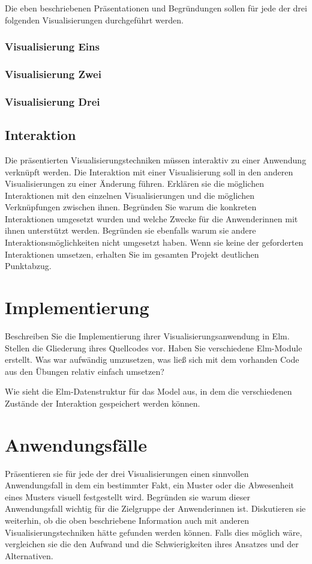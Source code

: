 \documentclass[usegeometry=true]{scrartcl}
\begin{document}
Die eben beschriebenen Präsentationen und Begründungen sollen für jede der drei folgenden Visualisierungen durchgeführt werden. 
\subsubsection{Visualisierung Eins}
\subsubsection{Visualisierung Zwei}
\subsubsection{Visualisierung Drei}

\subsection{Interaktion}
Die präsentierten Visualisierungstechniken müssen interaktiv zu einer Anwendung verknüpft werden.
Die Interaktion mit einer Visualisierung soll in den anderen Visualisierungen zu einer Änderung führen. 
Erklären sie die möglichen Interaktionen mit den einzelnen Visualisierungen und die möglichen Verknüpfungen zwischen ihnen. Begründen Sie warum die konkreten Interaktionen umgesetzt wurden und welche Zwecke für die Anwenderinnen mit ihnen unterstützt werden. Begründen sie ebenfalls warum sie andere Interaktionsmöglichkeiten nicht umgesetzt haben. Wenn sie keine der geforderten Interaktionen umsetzen, erhalten Sie im gesamten Projekt deutlichen Punktabzug. 

\section{Implementierung}
Beschreiben Sie die Implementierung ihrer Visualisierungsanwendung in Elm. Stellen die Gliederung ihres Quellcodes vor. Haben Sie verschiedene Elm-Module erstellt. Was war aufwändig umzusetzen, was ließ sich mit dem vorhanden Code aus den Übungen relativ einfach umsetzen? 

Wie sieht die Elm-Datenstruktur für das Model aus, in dem die verschiedenen Zustände der Interaktion gespeichert werden können.

\section{Anwendungsfälle}
Präsentieren sie für jede der drei Visualisierungen einen sinnvollen Anwendungsfall in dem ein bestimmter Fakt, ein Muster oder die Abwesenheit eines Musters visuell festgestellt wird. Begründen sie warum dieser Anwendungsfall wichtig für die Zielgruppe der Anwenderinnen ist. Diskutieren sie weiterhin, ob die oben beschriebene Information auch mit anderen Visualisierungstechniken hätte gefunden werden können. Falls dies möglich wäre, vergleichen sie die den Aufwand und die Schwierigkeiten ihres Ansatzes und der Alternativen. 
\end{document}
